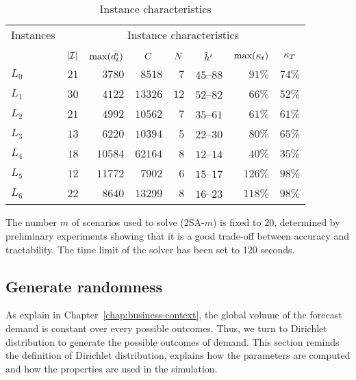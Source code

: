 \begin{table}[ht]
\begin{center}
\begin{tabular*}{\linewidth}{@{\extracolsep{\fill}}lrrrrrrr@{\extracolsep{\fill}}}
\hline
Instances &
\multicolumn{7}{c}{Instance characteristics}
\\\cline{2-8}
\\
& $\card{\REF}$
& $\max(\bar{d}_t^i)$
& \multicolumn{1}{c}{$C$}
& \multicolumn{1}{c}{$N$}
& \multicolumn{1}{c}{$\tilde{h}^i$}
& \multicolumn{1}{c}{$\max\bracket{\kappa_t}$}
& \multicolumn{1}{c}{$\kappa_{T}$}
\\\hline
$L_0$ & $21$ & $3780$ & $8518$ & $7$ & $45$--$88$ & $91\%$ & $74\%$
\\
$L_1$ & $30$ & $4122$ & $13326$ & $12$ & $52$--$82$ & $66\%$ & $52\%$
\\
$L_2$ & $21$ & $4992$ & $10562$ & $7$ & $35$--$61$ & $61\%$ & $61\%$
\\
$L_3$ & $13$ & $6220$ & $10394$ & $5$ & $22$--$30$ & $80\%$ & $65\%$
\\
$L_4$ & $18$ & $10584$ & $62164$ & $8$ & $12$--$14$ & $40\%$ & $35\%$
\\
$L_5$ & $12$ & $11772$ & $7902$ & $6$ & $15$--$17$ & $126\%$ & $98\%$
\\
$L_6$ & $22$ & $8640$ & $13299$ & $8$ & $16$--$23$ & $118\%$ & $98\%$
\\\hline
\end{tabular*}
\caption{Instance characteristics}
\label{tab:instances-characteristics}
\end{center}
\end{table}

The number $m$ of scenarios used to solve (2SA-$m$) is fixed to $20$, determined by preliminary experiments showing that it is a good trade-off between accuracy and tractability. The time limit of the solver has been set to $120$ seconds.




\subsection{Generate randomness}
\label{sec:PDP:numerical-experiments:dirichlet}


As explain in Chapter~\ref{chap:business-context}, the global volume of the forecast demand is constant over every possible outcomes. Thus, we turn to Dirichlet distribution to generate the possible outcomes of demand. This section reminds the definition of Dirichlet distribution, explains how the parameters are computed and how the properties are used in the simulation.


